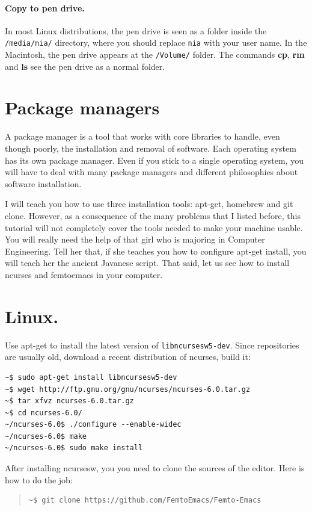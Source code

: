 \documentclass[a4paper,12pt]{book}
\begin{document}
\paragraph{Copy to pen drive.}
In most Linux distributions, the pen drive is
seen as a folder inside the \verb|/media/nia/|
directory, where you should replace \verb|nia|
with your user name. In the Macintosh, the
pen drive appears at the \verb|/Volume/| folder.
The commands {\bf cp}, {\bf rm} and {\bf ls}
see the pen drive as a normal folder.


\section{Package managers}
A package
manager is a tool that works with
core libraries to handle, even though poorly,
the installation and removal of
software. Each operating system has its own
package manager. Even if you stick to a single
operating system, you will have to
deal with many package managers
and different philosophies about
software installation.


I will teach you how to use three
installation tools: apt-get,
homebrew and git clone. However,
as a consequence
of the many problems that I listed
before, this tutorial will not
completely cover the tools needed
to make your machine usable.
You will really need the help of
that girl who is majoring in
Computer Engineering.
Tell her that, if she teaches you
how to configure apt-get install,
you will teach her the ancient
Javanese script. That said, let us
see how to install ncurses and
femtoemacs in your computer.


\section{Linux.} Use apt-get to install the
latest version of \verb|libncursesw5-dev|.
Since repositories are usually old,
 download a recent distribution of ncurses,
build it:
\begin{verbatim}
~$ sudo apt-get install libncursesw5-dev
~$ wget http://ftp.gnu.org/gnu/ncurses/ncurses-6.0.tar.gz
~$ tar xfvz ncurses-6.0.tar.gz
~$ cd ncurses-6.0/
~/ncurses-6.0$ ./configure --enable-widec
~/ncurses-6.0$ make
~/ncurses-6.0$ sudo make install
\end{verbatim}
After installing ncursesw, you you need to
clone the sources of the editor. Here is how
to do the job:
\begin{quote}
\begin{verbatim}
~$ git clone https://github.com/FemtoEmacs/Femto-Emacs
\end{verbatim}
\end{quote}
\end{document}
